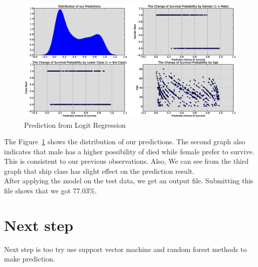\documentclass{article}
\begin{document}
\begin{figure}[h]
\begin{flushleft}
\hspace*{-1.2in}
\includegraphics[scale=0.4]{eps/prediction.eps} %
\caption{Prediction from Logit Regression}
\label {fig:pre}
\end{flushleft}
\end{figure}


The Figure~\ref{fig:pre} shows the distribution of our predictions. The second graph also indicates that male has a higher possibility of died while female prefer to survive. This is consistent to our previous observations. Also, We can see from the third graph that ship class has slight effect on the prediction result. \\

After applying the model on the test data, we get an output file. Submitting this file shows that we got 77.03\%.




\section{Next step}
Next step is too try use support vector machine and random forest methods to make prediction.
\end{document}

